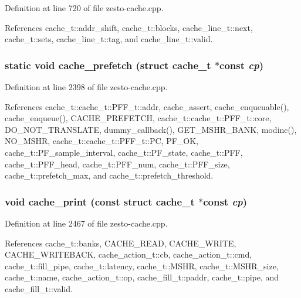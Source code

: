 Definition at line 720 of file zesto-cache.cpp.

References cache\_\-t::addr\_\-shift, cache\_\-t::blocks, cache\_\-line\_\-t::next, cache\_\-t::sets, cache\_\-line\_\-t::tag, and cache\_\-line\_\-t::valid.
\subsubsection[{cache\_\-prefetch}]{\setlength{\rightskip}{0pt plus 5cm}static void cache\_\-prefetch (struct {\bf cache\_\-t} $\ast$const  {\em cp})\hspace{0.3cm}{\tt  [static]}}\label{zesto-cache_8cpp_488a1ffa67f67839ee35d6925c2162d8}




Definition at line 2398 of file zesto-cache.cpp.

References cache\_\-t::cache\_\-t::PFF\_\-t::addr, cache\_\-assert, cache\_\-enqueuable(), cache\_\-enqueue(), CACHE\_\-PREFETCH, cache\_\-t::cache\_\-t::PFF\_\-t::core, DO\_\-NOT\_\-TRANSLATE, dummy\_\-callback(), GET\_\-MSHR\_\-BANK, modinc(), NO\_\-MSHR, cache\_\-t::cache\_\-t::PFF\_\-t::PC, PF\_\-OK, cache\_\-t::PF\_\-sample\_\-interval, cache\_\-t::PF\_\-state, cache\_\-t::PFF, cache\_\-t::PFF\_\-head, cache\_\-t::PFF\_\-num, cache\_\-t::PFF\_\-size, cache\_\-t::prefetch\_\-max, and cache\_\-t::prefetch\_\-threshold.
\subsubsection[{cache\_\-print}]{\setlength{\rightskip}{0pt plus 5cm}void cache\_\-print (const struct {\bf cache\_\-t} $\ast$const  {\em cp})}\label{zesto-cache_8cpp_5e18254876909dd853b5bdd65556188f}




Definition at line 2467 of file zesto-cache.cpp.

References cache\_\-t::banks, CACHE\_\-READ, CACHE\_\-WRITE, CACHE\_\-WRITEBACK, cache\_\-action\_\-t::cb, cache\_\-action\_\-t::cmd, cache\_\-t::fill\_\-pipe, cache\_\-t::latency, cache\_\-t::MSHR, cache\_\-t::MSHR\_\-size, cache\_\-t::name, cache\_\-action\_\-t::op, cache\_\-fill\_\-t::paddr, cache\_\-t::pipe, and cache\_\-fill\_\-t::valid.
